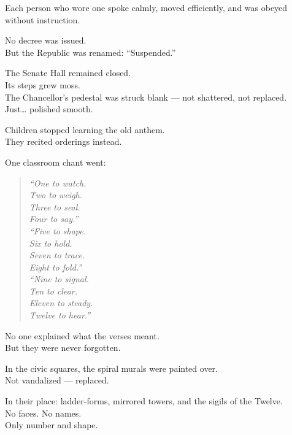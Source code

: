 \documentclass[12pt]{article}
\begin{document}
Each person who wore one spoke calmly, moved efficiently, and was obeyed without instruction.

\vspace{1em}

No decree was issued.\\
But the Republic was renamed: “Suspended.”

The Senate Hall remained closed.\\
Its steps grew moss.\\
The Chancellor’s pedestal was struck blank — not shattered, not replaced.\\
Just… polished smooth.

\vspace{1em}

Children stopped learning the old anthem.\\
They recited orderings instead.

One classroom chant went:

\begin{quote}
\textit{“One to watch.}\\
\textit{Two to weigh.}\\
\textit{Three to seal.}\\
\textit{Four to say.”}\\

\textit{“Five to shape.}\\
\textit{Six to hold.}\\
\textit{Seven to trace.}\\
\textit{Eight to fold.”}\\

\textit{“Nine to signal.}\\
\textit{Ten to clear.}\\
\textit{Eleven to steady.}\\
\textit{Twelve to hear.”}
\end{quote}

No one explained what the verses meant.\\
But they were never forgotten.

\vspace{1em}

In the civic squares, the spiral murals were painted over.\\
Not vandalized — replaced.

In their place: ladder-forms, mirrored towers, and the sigils of the Twelve.\\
No faces. No names.\\
Only number and shape.
\end{document}
